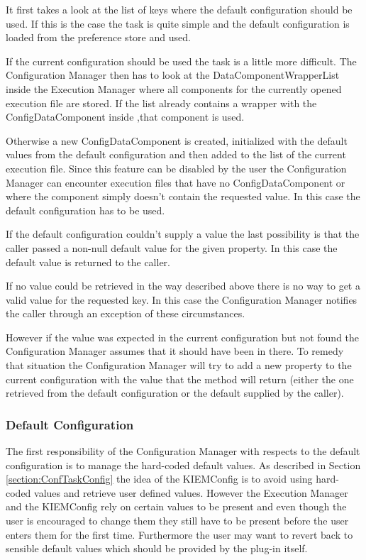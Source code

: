It first takes a look at the list of keys where the default configuration should be used. If this is the case the task is quite simple
and the default configuration is loaded from the preference store and used. 

If the current configuration should be used the task is a little more difficult. The Configuration Manager then has to look at the
DataComponentWrapperList inside the Execution Manager where all components for the currently opened
execution file are stored. If the list already contains a wrapper with the ConfigDataComponent inside
,that component is used. 

Otherwise a new ConfigDataComponent is created, initialized with the default values
from the default configuration and then added to the list of the current execution file. Since this feature
can be disabled by the user the Configuration Manager can encounter execution files that have no ConfigDataComponent
or where the component simply doesn't contain the requested value. In this case the default configuration has
to be used.

If the default configuration couldn't supply a value the last possibility is that the caller passed a non-null default 
value for the given property. In this case the default value is returned to the caller. 

If no value could be retrieved in the way described above there is no way to get a valid value for the requested key. 
In this case the Configuration Manager notifies the caller through an exception of these circumstances.

However if the value was expected in the current configuration but not found the Configuration Manager assumes 
that it should have been in there. To remedy that situation the Configuration Manager will try to add a new property 
to the current configuration with the value that the method will return (either the one retrieved from the default 
configuration or the default supplied by the caller).


\subsubsection{Default Configuration}
\label{section:DefaultConfiguration}

The first responsibility of the Configuration Manager with respects to the default configuration is to manage
the hard-coded default values. As described in Section \ref{section:ConfTaskConfig} the idea of the 
\ac{KIEMConfig} is to avoid using hard-coded values
and retrieve user defined values. However the Execution Manager and the \ac{KIEMConfig} rely on certain values
to be present and even though the user is encouraged to change them they still have to be present before the user
enters them for the first time. Furthermore the user may want to revert back to sensible default values which
should be provided by the plug-in itself.

